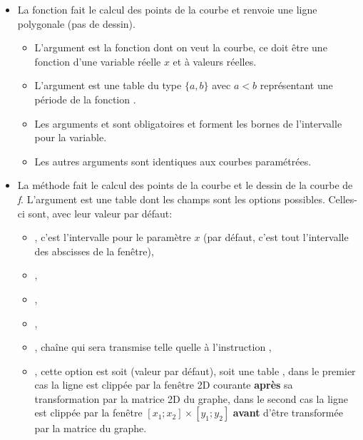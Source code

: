 \begin{itemize}
\item La fonction  fait le calcul des points de la courbe et renvoie une ligne polygonale (pas de dessin).

  \begin{itemize}
    \item L'argument  est la fonction dont on veut la courbe, ce doit être une fonction d'une variable réelle $x$ et à valeurs réelles.
    \item L'argument  est une table du type $\{a,b\}$ avec \(a<b\) représentant une période de la fonction .
    \item Les arguments  et  sont obligatoires et forment les bornes de l'intervalle pour la variable.
    \item Les autres arguments sont identiques aux courbes paramétrées.
  \end{itemize}
  
\item La méthode  fait le calcul des points de la courbe et le dessin de la courbe de \emph{f}. L'argument  est une table dont les champs sont les options possibles. Celles-ci sont, avec leur valeur par défaut:

  \begin{itemize}
      \item {}, c'est l'intervalle pour le paramètre $x$ (par défaut, c'est tout l'intervalle des abscisses de la fenêtre), 
      \item {}, 
      \item {},
      \item {},
      \item {},  chaîne qui sera transmise telle quelle à l'instruction \drawcmd,
      \item {}, cette option est soit \nil (valeur par défaut), soit une table , dans le premier cas la ligne est clippée par la fenêtre 2D courante \textbf{après} sa transformation par la matrice 2D du graphe, dans le second cas la ligne est clippée par la fenêtre $[x_1;x_2]\times[y_1;y_2]$ \textbf{avant} d'être transformée par la matrice du graphe.
  \end{itemize}

\end{itemize}

